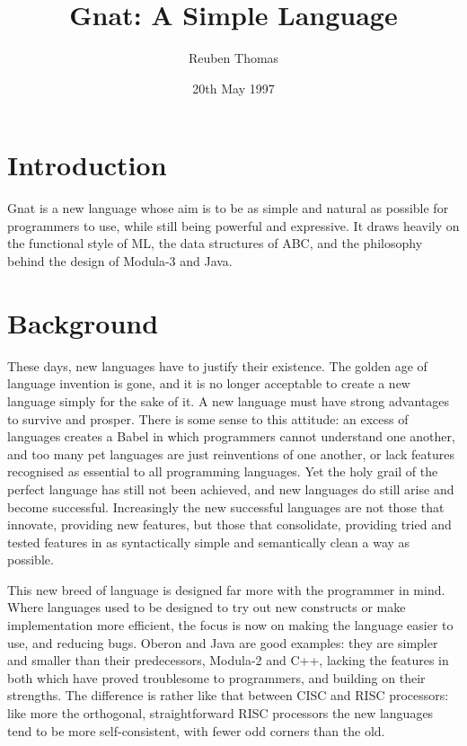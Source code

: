 \documentclass[english]{article}
\begin{document}
\title{Gnat: A Simple Language}
\author{Reuben Thomas}
\date{20th May 1997}
\maketitle



\section{Introduction}

Gnat is a new language whose aim is to be as simple and natural as possible for programmers to use, while still being powerful and expressive. It draws heavily on the functional style of ML, the data structures of ABC, and the philosophy behind the design of Modula-3 and Java.



\section{Background}

These days, new languages have to justify their existence. The golden age of language invention is gone, and it is no longer acceptable to create a new language simply for the sake of it. A new language must have strong advantages to survive and prosper. There is some sense to this attitude: an excess of languages creates a Babel in which programmers cannot understand one another, and too many pet languages are just reinventions of one another, or lack features recognised as essential to all programming languages. Yet the holy grail of the perfect language has still not been achieved, and new languages do still arise and become successful. Increasingly the new successful languages are not those that innovate, providing new features, but those that consolidate, providing tried and tested features in as syntactically simple and semantically clean a way as possible.

This new breed of language is designed far more with the programmer in mind. Where languages used to be designed to try out new constructs or make implementation more efficient, the focus is now on making the language easier to use, and reducing bugs. Oberon and Java are good examples: they are simpler and smaller than their predecessors, Modula-2 and C++, lacking the features in both which have proved troublesome to programmers, and building on their strengths. The difference is rather like that between CISC and RISC processors: like more the orthogonal, straightforward RISC processors the new languages tend to be more self-consistent, with fewer odd corners than the old.
\end{document}
